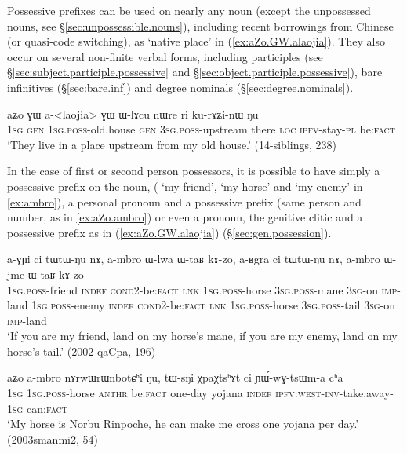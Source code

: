 Possessive prefixes can be used on nearly any noun (except the unpossessed nouns, see §\ref{sec:unpossessible.nouns}), including recent borrowings from Chinese (or quasi-code switching), as   `native place' in (\ref{ex:aZo.GW.alaojia}). They also occur on several non-finite verbal forms, including participles (see §\ref{sec:subject.participle.possessive} and §\ref{sec:object.participle.possessive}), bare infinitives (§\ref{sec:bare.inf}) and degree nominals (§\ref{sec:degree.nominals}).

\begin{exe}
\ex \label{ex:aZo.GW.alaojia}
\gll aʑo ɣɯ a-<laojia> ɣɯ ɯ-lɤcu nɯre ri ku-rɤʑi-nɯ ŋu \\
\textsc{1sg} \textsc{gen} \textsc{1sg}.\textsc{poss}-old.house \textsc{gen} \textsc{3sg}.\textsc{poss}-upstream there \textsc{loc} \textsc{ipfv}-stay-\textsc{pl} be:\textsc{fact} \\
\glt `They live in a place upstream from my old house.' (14-siblings, 238)
\end{exe}

In the case of first or second person possessors, it is possible to have simply a possessive prefix on the noun, ( `my friend',  `my horse' and  `my enemy' in \ref{ex:ambro}), a personal pronoun and a possessive prefix (same person and number, as in \ref{ex:aZo.ambro}) or even a pronoun, the genitive clitic  and a possessive prefix as in (\ref{ex:aZo.GW.alaojia}) (§\ref{sec:gen.possession}).

 \begin{exe}
\ex \label{ex:ambro} 
\gll a-ɣɲi ci tɯ\redp{}tɯ-ŋu nɤ, a-mbro ɯ-lwa ɯ-taʁ kɤ-zo, a-ʁgra ci tɯ\redp{}tɯ-ŋu nɤ, a-mbro ɯ-jme ɯ-taʁ kɤ-zo \\
\textsc{1sg}.\textsc{poss}-friend \textsc{indef} \textsc{cond}\redp{}2-be:\textsc{fact} \textsc{lnk} \textsc{1sg}.\textsc{poss}-horse \textsc{3sg}.\textsc{poss}-mane \textsc{3sg}-on \textsc{imp}-land \textsc{1sg}.\textsc{poss}-enemy \textsc{indef} \textsc{cond}\redp{}2-be:\textsc{fact} \textsc{lnk} \textsc{1sg}.\textsc{poss}-horse \textsc{3sg}.\textsc{poss}-tail  \textsc{3sg}-on \textsc{imp}-land  \\
\glt `If you are my friend, land on my horse's mane, if you are my enemy, land on my horse's tail.' (2002 qaCpa, 196)
\end{exe}

\begin{exe}
\ex \label{ex:aZo.ambro}
\gll aʑo a-mbro nɤrwɯrɯnbotɕʰi ŋu, tɯ-sŋi χpaχtsʰɤt ci ɲɯ́-wɣ-tsɯm-a cʰa \\
\textsc{1sg} \textsc{1sg}.\textsc{poss}-horse  \textsc{anthr} be:\textsc{fact} one-day yojana \textsc{indef} \textsc{ipfv}:\textsc{west}-\textsc{inv}-take.away-\textsc{1sg} can:\textsc{fact} \\
\glt `My horse is Norbu Rinpoche, he can make me cross one yojana per day.' (2003smanmi2, 54)
\end{exe}


